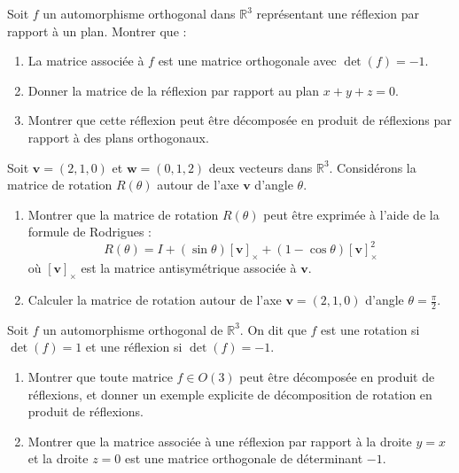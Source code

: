 \begin{exercice}
Soit \( f \) un automorphisme orthogonal dans \( \mathbb{R}^3 \) représentant une réflexion par rapport à un plan. Montrer que :
\begin{enumerate}
    \item La matrice associée à \( f \) est une matrice orthogonale avec \( \det(f) = -1 \).
    \item Donner la matrice de la réflexion par rapport au plan \( x + y + z = 0 \).
    \item Montrer que cette réflexion peut être décomposée en produit de réflexions par rapport à des plans orthogonaux.
\end{enumerate}
\end{exercice}

\begin{exercice}
Soit \( \mathbf{v} = (2, 1, 0) \) et \( \mathbf{w} = (0, 1, 2) \) deux vecteurs dans \( \mathbb{R}^3 \). Considérons la matrice de rotation \( R(\theta) \) autour de l'axe \( \mathbf{v} \) d'angle \( \theta \).
\begin{enumerate}
    \item Montrer que la matrice de rotation \( R(\theta) \) peut être exprimée à l'aide de la formule de Rodrigues :
    \[
    R(\theta) = I + (\sin \theta) [\mathbf{v}]_\times + (1 - \cos \theta) [\mathbf{v}]_\times^2
    \]
    où \( [\mathbf{v}]_\times \) est la matrice antisymétrique associée à \( \mathbf{v} \).
    \item Calculer la matrice de rotation autour de l'axe \( \mathbf{v} = (2, 1, 0) \) d'angle \( \theta = \frac{\pi}{2} \).
\end{enumerate}
\end{exercice}

\begin{exercice}
Soit \( f \) un automorphisme orthogonal de \( \mathbb{R}^3 \). On dit que \( f \) est une rotation si \( \det(f) = 1 \) et une réflexion si \( \det(f) = -1 \).
\begin{enumerate}
    \item Montrer que toute matrice \( f \in O(3) \) peut être décomposée en produit de réflexions, et donner un exemple explicite de décomposition de rotation en produit de réflexions.
    \item Montrer que la matrice associée à une réflexion par rapport à la droite \( y = x \) et la droite \( z = 0 \) est une matrice orthogonale de déterminant \( -1 \).
\end{enumerate}
\end{exercice}

